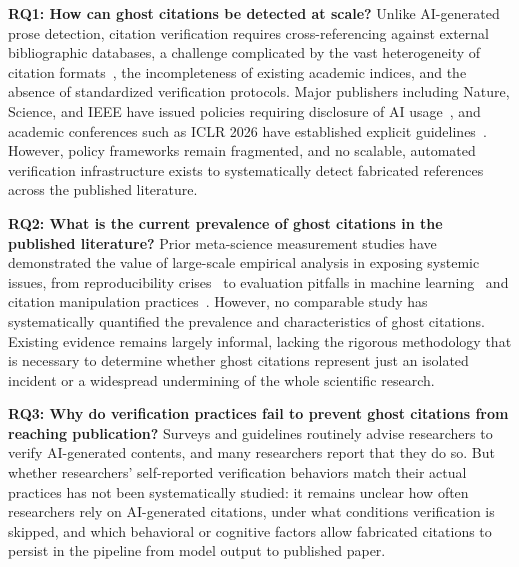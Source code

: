 \noindent
\textbf{RQ1: How can ghost citations be detected at scale?}
Unlike AI-generated prose detection, citation verification requires cross-referencing against external bibliographic databases, a challenge complicated by the vast heterogeneity of citation formats~\cite{ISO690_2021}, the incompleteness of existing academic indices, and the absence of standardized verification protocols.
Major publishers including Nature, Science, and IEEE have issued policies requiring disclosure of AI usage~\cite{nature2023tools,thorp2023chatgpt,ieee2025ai-policy}, and academic conferences such as ICLR 2026 have established explicit guidelines~\cite{chairs2025iclr}.
However, policy frameworks remain fragmented, and no scalable, automated verification infrastructure exists to systematically detect fabricated references across the published literature.

\noindent
\textbf{RQ2: What is the current prevalence of ghost citations in the published literature?}
Prior meta-science measurement studies have demonstrated the value of large-scale empirical analysis in exposing systemic issues, from reproducibility crises~\cite{baker2016reproducibility,ioannidis2005most} to evaluation pitfalls in machine learning~\cite{lipton2018troubling,wagstaff2012machine} and citation manipulation practices~\cite{fister2016toward}.
However, no comparable study has systematically quantified the prevalence and characteristics of ghost citations.
Existing evidence remains largely informal, lacking the rigorous methodology that is necessary to determine whether ghost citations represent just an isolated incident or a widespread undermining of the whole scientific research.

\noindent
\textbf{RQ3: Why do verification practices fail to prevent ghost citations from reaching publication?}
Surveys and guidelines routinely advise researchers to verify AI-generated contents\cite{cotton2024chatting,dwivedi2023so}, and many researchers report that they do so\cite{lee2025impact}.
But whether researchers' self-reported verification behaviors match their actual practices has not been systematically studied: it remains unclear how often researchers rely on AI-generated citations, under what conditions verification is skipped, and which behavioral or cognitive factors allow fabricated citations to persist in the pipeline from model output to published paper.

